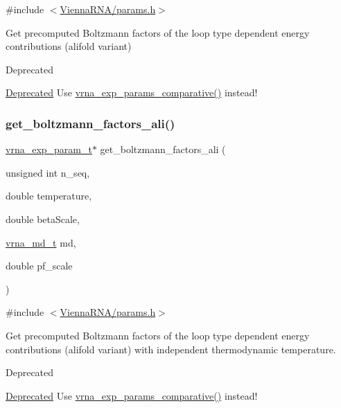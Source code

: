 {\ttfamily \#include $<$\hyperlink{params_8h}{Vienna\+R\+N\+A/params.\+h}$>$}



Get precomputed Boltzmann factors of the loop type dependent energy contributions (alifold variant) 

\begin{DoxyRefDesc}{Deprecated}
\item[\hyperlink{deprecated__deprecated000097}{Deprecated}]Use \hyperlink{group__energy__parameters_gaf78c09e685e6eef4100b1a41d4042550}{vrna\+\_\+exp\+\_\+params\+\_\+comparative()} instead!\end{DoxyRefDesc}
\mbox{\label{group__energy__parameters_ga2aa1d87c97f35d2e4121634a17556829}} 
\subsubsection{\texorpdfstring{get\+\_\+boltzmann\+\_\+factors\+\_\+ali()}{get\_boltzmann\_factors\_ali()}}
{\footnotesize\ttfamily \hyperlink{group__energy__parameters_ga01d8b92fe734df8d79a6169482c7d8d8}{vrna\+\_\+exp\+\_\+param\+\_\+t}$\ast$ get\+\_\+boltzmann\+\_\+factors\+\_\+ali (\begin{DoxyParamCaption}\item[{unsigned int}]{n\+\_\+seq,  }\item[{double}]{temperature,  }\item[{double}]{beta\+Scale,  }\item[{\hyperlink{group__model__details_ga1f8a10e12a0a1915f2a4eff0b28ea17c}{vrna\+\_\+md\+\_\+t}}]{md,  }\item[{double}]{pf\+\_\+scale }\end{DoxyParamCaption})}



{\ttfamily \#include $<$\hyperlink{params_8h}{Vienna\+R\+N\+A/params.\+h}$>$}



Get precomputed Boltzmann factors of the loop type dependent energy contributions (alifold variant) with independent thermodynamic temperature. 

\begin{DoxyRefDesc}{Deprecated}
\item[\hyperlink{deprecated__deprecated000098}{Deprecated}]Use \hyperlink{group__energy__parameters_gaf78c09e685e6eef4100b1a41d4042550}{vrna\+\_\+exp\+\_\+params\+\_\+comparative()} instead!\end{DoxyRefDesc}
\mbox{\label{group__energy__parameters_ga541f2cf7436e9bc939b0a49b24baf987}} 
